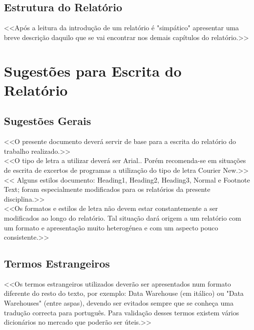 \documentclass[a4paper,12pt]{scrreprt}
\begin{document}
    \section{Estrutura do Relatório}
        <<Após a leitura da introdução de um relatório é "simpático" apresentar uma breve descrição daquilo que se vai encontrar nos demais capítulos do relatório.>>




\chapter{Sugestões para Escrita do Relatório}

    \section{Sugestões Gerais}
        <<O presente documento deverá servir de base para a escrita do relatório do trabalho realizado.>>\\

        <<O tipo de letra a utilizar deverá ser Arial.. Porém recomenda-se em situações de escrita de excertos de programas a utilização do tipo de letra Courier New.>>\\

        << Alguns estilos documento: Heading1, Heading2, Heading3, Normal e Footnote Text; foram especialmente modificados para os relatórios da presente disciplina.>>\\

        <<Os formatos e estilos de letra não devem estar constantemente a ser modificados ao longo do relatório. Tal situação dará origem a um relatório com um formato e apresentação muito heterogénea e com um aspecto pouco consistente.>>
    \section{Termos Estrangeiros}
        <<Os termos estrangeiros utilizados deverão ser apresentados num formato diferente do resto do texto, por exemplo: Data Warehouse (em itálico) ou "Data Warehouses" (entre aspas), devendo ser evitados sempre que se conheça uma tradução correcta para português. Para validação desses termos existem vários dicionários no mercado que poderão ser úteis.>>
\end{document}
